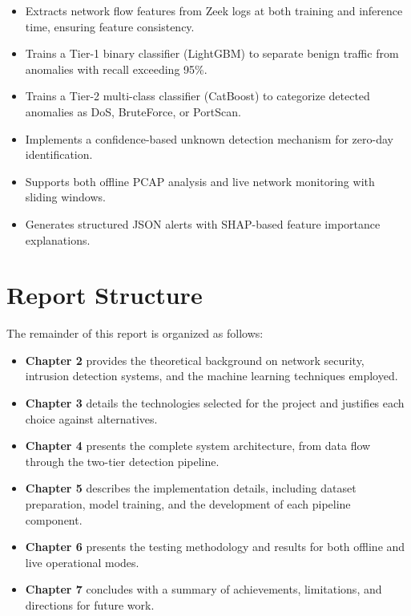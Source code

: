 \documentclass[12pt,a4paper,twoside]{report}
\begin{document}
\begin{itemize}
    \item Extracts network flow features from Zeek logs at both training and inference time, ensuring feature consistency.
    \item Trains a Tier-1 binary classifier (LightGBM) to separate benign traffic from anomalies with recall exceeding 95\%.
    \item Trains a Tier-2 multi-class classifier (CatBoost) to categorize detected anomalies as DoS, BruteForce, or PortScan.
    \item Implements a confidence-based unknown detection mechanism for zero-day identification.
    \item Supports both offline PCAP analysis and live network monitoring with sliding windows.
    \item Generates structured JSON alerts with SHAP-based feature importance explanations.
\end{itemize}

\section{Report Structure}

The remainder of this report is organized as follows:

\begin{itemize}
    \item \textbf{Chapter 2} provides the theoretical background on network security, intrusion detection systems, and the machine learning techniques employed.
    \item \textbf{Chapter 3} details the technologies selected for the project and justifies each choice against alternatives.
    \item \textbf{Chapter 4} presents the complete system architecture, from data flow through the two-tier detection pipeline.
    \item \textbf{Chapter 5} describes the implementation details, including dataset preparation, model training, and the development of each pipeline component.
    \item \textbf{Chapter 6} presents the testing methodology and results for both offline and live operational modes.
    \item \textbf{Chapter 7} concludes with a summary of achievements, limitations, and directions for future work.
\end{itemize}

\end{document}
